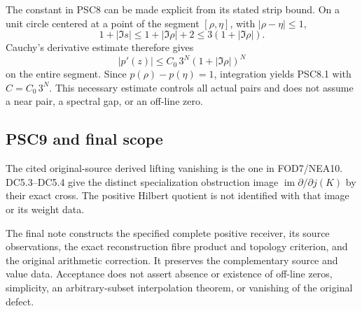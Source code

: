 The constant in PSC8 can be made explicit from its stated strip bound.
On a unit circle centered at a point of the segment \([\rho,\eta]\),
with \(|\rho-\eta|\le1\), \[
1+|\Im s|\le 1+|\Im\rho|+2
\le3(1+|\Im\rho|).
\] Cauchy's derivative estimate therefore gives \[
|p'(z)|\le C_0\,3^N(1+|\Im\rho|)^N
\] on the entire segment. Since \(p(\rho)-p(\eta)=1\), integration
yields PSC8.1 with \(C=C_0\,3^N\). This necessary estimate controls all
actual pairs and does not assume a near pair, a spectral gap, or an
off-line zero.

\subsection{PSC9 and final scope}\label{psc9-and-final-scope}

The cited original-source derived lifting vanishing is the one in
FOD7/NEA10. DC5.3--DC5.4 give the distinct specialization obstruction
image \(\operatorname{im}\partial/\partial j(K)\) by their exact cross.
The positive Hilbert quotient is not identified with that image or its
weight data.

The final note constructs the specified complete positive receiver, its
source observations, the exact reconstruction fibre product and topology
criterion, and the original arithmetic correction. It preserves the
complementary source and value data. Acceptance does not assert absence
or existence of off-line zeros, simplicity, an arbitrary-subset
interpolation theorem, or vanishing of the original defect.
